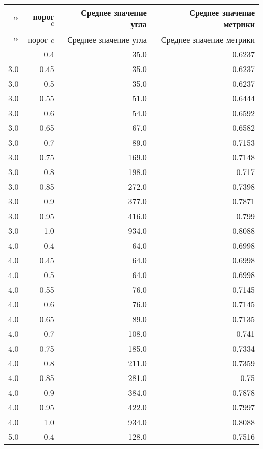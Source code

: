 
\begin{center}
\begin{longtable}{|r|r|r|r|}
\hline
\(\alpha\) & порог \(c\) & Среднее значение угла & Среднее значение метрики \\
\hline
\endfirsthead

\hline
\(\alpha\) & порог \(c\) & Среднее значение угла & Среднее значение метрики \\
\hline
\endhead

\hline
\endfoot

\hline
\endlastfoot
3.0 & 0.4 & 35.0 & 0.6237 \\
\hline
3.0 & 0.45 & 35.0 & 0.6237 \\
\hline
3.0 & 0.5 & 35.0 & 0.6237 \\
\hline
3.0 & 0.55 & 51.0 & 0.6444 \\
\hline
3.0 & 0.6 & 54.0 & 0.6592 \\
\hline
3.0 & 0.65 & 67.0 & 0.6582 \\
\hline
3.0 & 0.7 & 89.0 & 0.7153 \\
\hline
3.0 & 0.75 & 169.0 & 0.7148 \\
\hline
3.0 & 0.8 & 198.0 & 0.717 \\
\hline
3.0 & 0.85 & 272.0 & 0.7398 \\
\hline
3.0 & 0.9 & 377.0 & 0.7871 \\
\hline
3.0 & 0.95 & 416.0 & 0.799 \\
\hline
3.0 & 1.0 & 934.0 & 0.8088 \\
\hline
4.0 & 0.4 & 64.0 & 0.6998 \\
\hline
4.0 & 0.45 & 64.0 & 0.6998 \\
\hline
4.0 & 0.5 & 64.0 & 0.6998 \\
\hline
4.0 & 0.55 & 76.0 & 0.7145 \\
\hline
4.0 & 0.6 & 76.0 & 0.7145 \\
\hline
4.0 & 0.65 & 89.0 & 0.7135 \\
\hline
4.0 & 0.7 & 108.0 & 0.741 \\
\hline
4.0 & 0.75 & 185.0 & 0.7334 \\
\hline
4.0 & 0.8 & 211.0 & 0.7359 \\
\hline
4.0 & 0.85 & 281.0 & 0.75 \\
\hline
4.0 & 0.9 & 384.0 & 0.7878 \\
\hline
4.0 & 0.95 & 422.0 & 0.7997 \\
\hline
4.0 & 1.0 & 934.0 & 0.8088 \\
\hline
5.0 & 0.4 & 128.0 & 0.7516 \\

\end{longtable}
\end{center}
